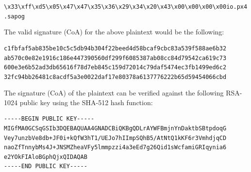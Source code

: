 \documentclass{zubaxdoc}
\begin{document}
\verb|\x33\xff\xd5\x05\x47\x47\x35\x36\x29\x34\x20\x43\x00\x00\x00\x00io.px4.sapog|

The valid signature (CoA) for the above plaintext would be the following:

\begin{minipage}{0.7\textwidth}
\begin{verbatim}
c1fbfaf5ab835be10c5c5db94b304f22beed4d58bcaf9cbc83a539f588ae6b32
ab570c0e82e1916c186e447390560df299f6085387ab08cc84d79542ca619c73
600e3e6b52ad3db65616f78d7eb845c159d72014c79daf5474ec3fb1499ed6c2
32fc94bb26481c8acdf5a3e0022daf17e80378a6137776222b65d59454066cbd
\end{verbatim}
\end{minipage}

The signature (CoA) of the plaintext can be verified against the following RSA-1024 public key
using the SHA-512 hash function:

\begin{minipage}{0.7\textwidth}
\begin{verbatim}
-----BEGIN PUBLIC KEY-----
MIGfMA0GCSqGSIb3DQEBAQUAA4GNADCBiQKBgQDLrAYWFBmjnYnDaktbSBtpdoqG
Vey7unzbVe8db+JF0i+kQfW3hT1/UEJo7hIImpSQhB5/AtNtQ1kKF6r3VmhdjqCD
naoZfTnnybMs4J+JNSMZheaVFy5lmmpzzi4a3eEd7g26Qid1sWcfamiGRIqynia6
e2YOkFIAloBGphQjxQIDAQAB
-----END PUBLIC KEY-----
\end{verbatim}
\end{minipage}
\end{document}
